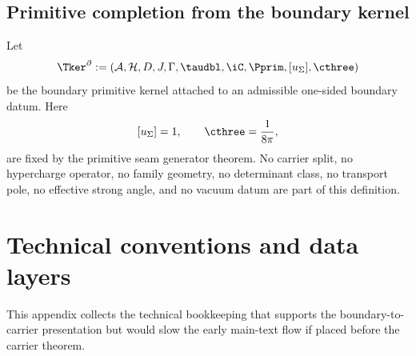 \subsection{Primitive completion from the boundary kernel}

\begin{definition}
\label{def:boundary-primitive-kernel}
\label{def:post-carrier-primitive-kernel}
Let
\[
\Tker^\partial
:=
(\mathcal A,\mathcal H,D,J,\Gamma,\taudbl,\iC,\Pprim,[u_\Sigma],\cthree)
\]
be the boundary primitive kernel attached to an admissible one-sided boundary datum. Here
\[
[u_\Sigma]=1,
\qquad
\cthree=\frac{1}{8\pi},
\]
are fixed by the primitive seam generator theorem. No carrier split, no hypercharge operator, no
family geometry, no determinant class, no transport pole, no effective strong angle, and no
vacuum datum are part of this definition.
\end{definition}


\section{Technical conventions and data layers}
\label{app:tech}

This appendix collects the technical bookkeeping that supports the boundary-to-carrier presentation but would slow the early main-text flow if placed before the carrier theorem.

